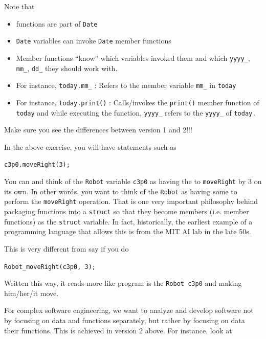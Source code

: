 Note that
\begin{itemize}
\item functions are part of \texttt{Date}
\item \texttt{Date} variables can invoke \texttt{Date} member functions
\item Member functions ``know'' which variables invoked them and which
  \texttt{yyyy\_}, \texttt{mm\_}, \texttt{dd\_} they should work with.
\item For instance, \texttt{today.mm\_} : Refers to the member variable
  \texttt{mm\_} in \texttt{today}
\item For instance, \texttt{today.print()} : Calls/invokes the \texttt{print()}
  member function of \texttt{today} and while executing the function,
  \texttt{yyyy\_} refers to the \texttt{yyyy\_} of \texttt{today.}
\end{itemize}

Make sure you see the differences between version 1 and 2!!!


In the above exercise, you will have statements such as

\texttt{c3p0.moveRight(3);}

You can and  think of the \texttt{Robot} variable
\texttt{c3p0} as having the  to \texttt{moveRight} by 3 on
its own. In other words, you want to think of the \texttt{Robot} as having
some  to perform the \texttt{moveRight}
operation. That is one very important philosophy behind packaging
functions into a \texttt{struct} so that they become members (i.e. member
functions) as the \texttt{struct} variable. In
fact, historically, the earliest example of a programming language that
allows this is from the MIT AI lab in the late 50s.

This is very different from say if you do

\texttt{Robot\_moveRight(c3p0, 3);}

Written this way, it reads more like  program is
 the \texttt{Robot c3p0} and making him/her/it move.

For complex software engineering, we want to analyze and develop
software not by focusing on data and functions separately, but rather by
focusing on data  their functions. This is achieved in version 2
above. For instance, look at


